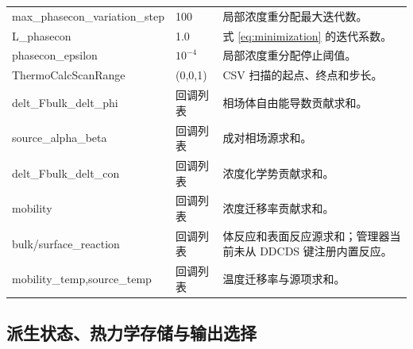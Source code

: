 \documentclass[UTF8,a4paper,11pt]{ctexart}
\begin{document}
\begin{longtable}{>{\ttfamily}p{}p{}p{}}
max\_phasecon\_variation\_step & 100 & 局部浓度重分配最大迭代数。\\
L\_phasecon & 1.0 & 式 \eqref{eq:minimization} 的迭代系数。\\
phasecon\_epsilon & $10^{-4}$ & 局部浓度重分配停止阈值。\\
ThermoCalcScanRange & (0,0,1) & CSV 扫描的起点、终点和步长。\\
delt\_Fbulk\_delt\_phi & 回调列表 & 相场体自由能导数贡献求和。\\
source\_alpha\_beta & 回调列表 & 成对相场源求和。\\
delt\_Fbulk\_delt\_con & 回调列表 & 浓度化学势贡献求和。\\
mobility & 回调列表 & 浓度迁移率贡献求和。\\
bulk/surface\_reaction & 回调列表 & 体反应和表面反应源求和；管理器当前未从 DDCDS 键注册内置反应。\\
mobility\_temp,source\_temp & 回调列表 & 温度迁移率与源项求和。\\
\bottomrule
\end{longtable}

\subsection{派生状态、热力学存储与输出选择}
\end{document}
